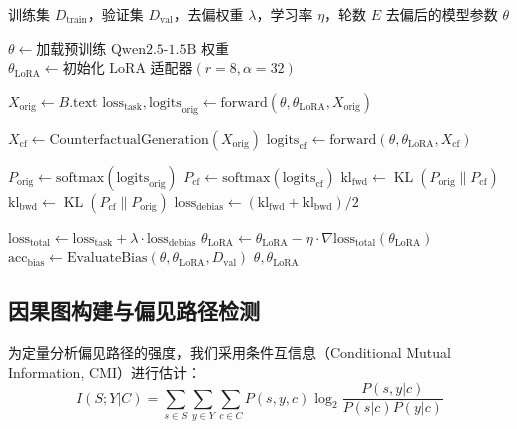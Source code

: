 \documentclass[12pt,a4paper,oneside]{ctexart}
\newcommand{\KL}{\operatorname{KL}}
\begin{document}
\begin{algorithm}[H]
  \caption{Do-operator 干预微调}
  \label{alg:do_operator}
  \begin{algorithmic}[1]
    \Require 训练集 $D_{\text{train}}$，验证集 $D_{\text{val}}$，去偏权重 $\lambda$，学习率 $\eta$，轮数 $E$
    \Ensure 去偏后的模型参数 $\theta$

    \State $\theta \gets \text{加载预训练 Qwen2.5-1.5B 权重}$
    \State $\theta_{\text{LoRA}} \gets \text{初始化 LoRA 适配器} (r=8, \alpha=32)$

        \State $X_{\text{orig}} \gets B.\text{text}$
        \State $\text{loss}_{\text{task}}, \text{logits}_{\text{orig}} \gets \text{forward}(\theta, \theta_{\text{LoRA}}, X_{\text{orig}})$

        \State $X_{\text{cf}} \gets \text{CounterfactualGeneration}(X_{\text{orig}})$
        \State $\text{logits}_{\text{cf}} \gets \text{forward}(\theta, \theta_{\text{LoRA}}, X_{\text{cf}})$ 

        \State $P_{\text{orig}} \gets \text{softmax}(\text{logits}_{\text{orig}})$
        \State $P_{\text{cf}} \gets \text{softmax}(\text{logits}_{\text{cf}})$
        \State $\text{kl}_{\text{fwd}} \gets \KL(P_{\text{orig}} \parallel P_{\text{cf}})$
        \State $\text{kl}_{\text{bwd}} \gets \KL(P_{\text{cf}} \parallel P_{\text{orig}})$
        \State $\text{loss}_{\text{debias}} \gets (\text{kl}_{\text{fwd}} + \text{kl}_{\text{bwd}}) / 2$

        \State $\text{loss}_{\text{total}} \gets \text{loss}_{\text{task}} + \lambda \cdot \text{loss}_{\text{debias}}$
        \State $\theta_{\text{LoRA}} \gets \theta_{\text{LoRA}} - \eta \cdot \nabla \text{loss}_{\text{total}}(\theta_{\text{LoRA}})$
      \EndFor
      \State $\text{acc}_{\text{bias}} \gets \text{EvaluateBias}(\theta, \theta_{\text{LoRA}}, D_{\text{val}})$
    \EndFor
    \State \Return $\theta, \theta_{\text{LoRA}}$
  \end{algorithmic}
\end{algorithm}

\subsection{因果图构建与偏见路径检测}

为定量分析偏见路径的强度，我们采用条件互信息（Conditional Mutual Information, CMI）进行估计：
\begin{equation}
  I(S; Y | C) = \sum_{s \in S} \sum_{y \in Y} \sum_{c \in C} P(s, y, c) \log_2 \frac{P(s, y|c)}{P(s|c)P(y|c)}
  \label{eq:cmi}
\end{equation}
\end{document}

